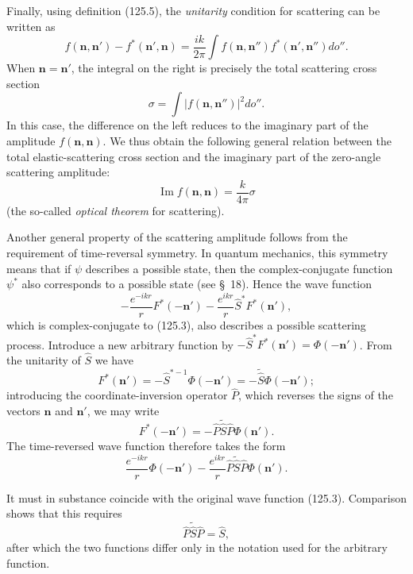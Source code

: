 Finally, using definition (125.5), the \emph{unitarity} condition for scattering can be written as
\begin{equation}
 f(\mathbf n,\mathbf n')-f^*(\mathbf n',\mathbf n)
 =\frac{ik}{2\pi}\int f(\mathbf n,\mathbf n'')
 f^*(\mathbf n',\mathbf n'')do''.
 \tag{125.8}
\end{equation}
When $\mathbf n=\mathbf n'$, the integral on the right is precisely the total scattering cross section
\[
 \sigma=\int|f(\mathbf n,\mathbf n'')|^2do''.
\]
In this case, the difference on the left reduces to the imaginary part of the amplitude $f(\mathbf n,\mathbf n)$. We thus obtain the following general relation between the total elastic-scattering cross section and the imaginary part of the zero-angle scattering amplitude:
\begin{equation}
 \operatorname{Im}f(\mathbf n,\mathbf n)=\frac{k}{4\pi}\sigma
 \tag{125.9}
\end{equation}
(the so-called \emph{optical theorem} for scattering).

Another general property of the scattering amplitude follows from the requirement of time-reversal symmetry. In quantum mechanics, this symmetry means that if $\psi$ describes a possible state, then the complex-conjugate function $\psi^*$ also corresponds to a possible state (see §~18). Hence the wave function
\[
 -\frac{e^{-ikr}}rF^*(-\mathbf n')
 -\frac{e^{ikr}}r\hat S^*F^*(\mathbf n'),
\]
which is complex-conjugate to (125.3), also describes a possible scattering process. Introduce a new arbitrary function by $-\hat S^*F^*(\mathbf n')=\Phi(-\mathbf n')$. From the unitarity of $\hat S$ we have
\[
 F^*(\mathbf n')=-\hat S^{*-1}\Phi(-\mathbf n')=-\widetilde{\hat S}
 \Phi(-\mathbf n');
\]
introducing the coordinate-inversion operator $\hat P$, which reverses the signs of the vectors $\mathbf n$ and $\mathbf n'$, we may write
\[
 F^*(-\mathbf n')=-\hat P\widetilde{\hat S}\hat P\Phi(\mathbf n').
\]
The time-reversed wave function therefore takes the form
\[
 \frac{e^{-ikr}}r\Phi(-\mathbf n')
 -\frac{e^{ikr}}r\hat P\widetilde{\hat S}\hat P\Phi(\mathbf n').
\]

It must in substance coincide with the original wave function (125.3). Comparison shows that this requires
\begin{equation}
 \hat P\widetilde{\hat S}\hat P=\hat S,
 \tag{125.10}
\end{equation}
after which the two functions differ only in the notation used for the arbitrary function.

